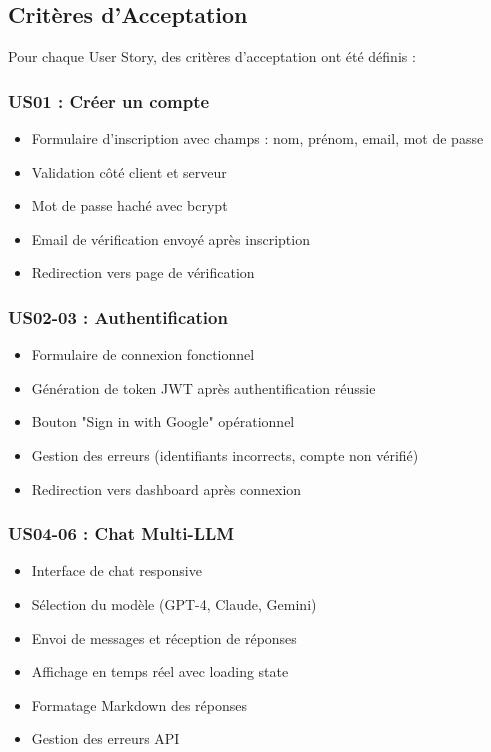 \subsection{Critères d'Acceptation}

Pour chaque User Story, des critères d'acceptation ont été définis :

\subsubsection{US01 : Créer un compte}

\begin{itemize}
    \item Formulaire d'inscription avec champs : nom, prénom, email, mot de passe
    \item Validation côté client et serveur
    \item Mot de passe haché avec bcrypt
    \item Email de vérification envoyé après inscription
    \item Redirection vers page de vérification
\end{itemize}

\subsubsection{US02-03 : Authentification}

\begin{itemize}
    \item Formulaire de connexion fonctionnel
    \item Génération de token JWT après authentification réussie
    \item Bouton "Sign in with Google" opérationnel
    \item Gestion des erreurs (identifiants incorrects, compte non vérifié)
    \item Redirection vers dashboard après connexion
\end{itemize}

\subsubsection{US04-06 : Chat Multi-LLM}

\begin{itemize}
    \item Interface de chat responsive
    \item Sélection du modèle (GPT-4, Claude, Gemini)
    \item Envoi de messages et réception de réponses
    \item Affichage en temps réel avec loading state
    \item Formatage Markdown des réponses
    \item Gestion des erreurs API
\end{itemize}

